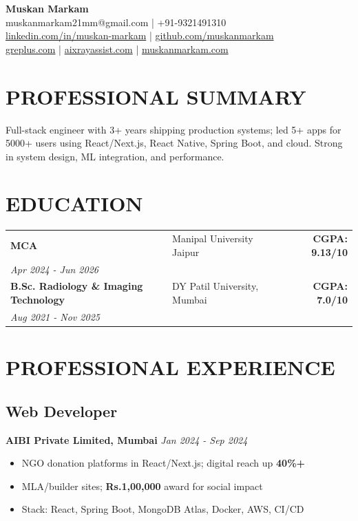 \documentclass[10pt,a4paper]{article}
\newcommand{\rupee}{Rs.}
\newcommand{\header}[3]{
    \begin{center}
        {\fontsize{13}{15}\selectfont\bfseries\color{primary} #1}\\[0pt]
        {\fontsize{8.5}{10}\selectfont #2}\\[0pt]
        {\fontsize{8.5}{10}\selectfont #3}
    \end{center}
    \vspace{-2pt}
}
\newcommand{\experience}[4]{
    \subsection{#1}
    \textbf{#2} \hfill {\fontsize{9}{10}\selectfont\itshape #3}\\
    \vspace{-10pt}
    #4
}
\def\hfill{ }%
\begin{document}
\fontsize{9.5}{11}\selectfont

\header{Muskan Markam}{muskanmarkam21mm@gmail.com | +91-9321491310}{\href{https://www.linkedin.com/in/muskan-markam}{linkedin.com/in/muskan-markam} | \href{https://github.com/muskanmarkam}{github.com/muskanmarkam}\\\href{https://greplus.com}{greplus.com} | \href{https://aixrayassist.com}{aixrayassist.com} | \href{https://muskanmarkam.com}{muskanmarkam.com}}

\section{PROFESSIONAL SUMMARY}
\vspace{2pt}
Full-stack engineer with 3+ years shipping production systems; led 5+ apps for 5000+ users using React/Next.js, React Native, Spring Boot, and cloud. Strong in system design, ML integration, and performance.

\section{EDUCATION}
\vspace{2pt}
\begin{tabularx}{\textwidth}{@{}X X r@{}}
    \textbf{MCA} & Manipal University Jaipur & \textbf{CGPA: 9.13/10}\\
    {\fontsize{9}{10}\selectfont\itshape Apr 2024 - Jun 2026} & & \\
    \textbf{B.Sc. Radiology \& Imaging Technology} & DY Patil University, Mumbai & \textbf{CGPA: 7.0/10}\\
    {\fontsize{9}{10}\selectfont\itshape Aug 2021 - Nov 2025} & & \\
\end{tabularx}

\section{PROFESSIONAL EXPERIENCE}
\vspace{2pt}
\experience{Web Developer}{AIBI Private Limited, Mumbai}{Jan 2024 - Sep 2024}{
\begin{itemize}
    \item NGO donation platforms in React/Next.js; digital reach up \textbf{40\%+}
    \item MLA/builder sites; \textbf{\rupee{}1,00,000} award for social impact
    \item Stack: React, Spring Boot, MongoDB Atlas, Docker, AWS, CI/CD
\end{itemize}
}
\end{document}

